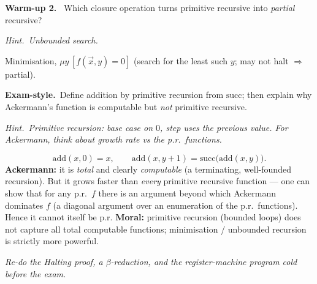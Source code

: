 \documentclass[11pt,a4paper]{article}
\newcommand{\hint}[1]{\par{\small\textcolor{accent}{\textit{Hint.}}\ \textit{#1}}\par\smallskip}
\newcommand{\warm}[1]{\smallskip\textbf{\textcolor{hi}{Warm-up #1.}}\ }
\newcommand{\exam}{\smallskip\textbf{\textcolor{warn}{Exam-style.}}\ }
\begin{document}
\warm{2} Which closure operation turns primitive recursive into \emph{partial} recursive?
\hint{Unbounded search.}
\begin{sol}Minimisation, $\mu y\,[f(\vec x,y)=0]$ (search for the least such $y$; may not halt $\Rightarrow$ partial).\end{sol}

\exam Define addition by primitive recursion from $\mathrm{succ}$; then explain why Ackermann's function is computable but \emph{not} primitive recursive.
\hint{Primitive recursion: base case on $0$, step uses the previous value. For Ackermann, think about growth rate vs the p.r.\ functions.}
\begin{sol}
\[
\mathrm{add}(x,0)=x,\qquad \mathrm{add}(x,y{+}1)=\mathrm{succ}\big(\mathrm{add}(x,y)\big).
\]
\textbf{Ackermann:} it is \emph{total} and clearly \emph{computable} (a terminating, well-founded recursion). But it grows faster than \emph{every} primitive recursive function --- one can show that for any p.r.\ $f$ there is an argument beyond which Ackermann dominates $f$ (a diagonal argument over an enumeration of the p.r.\ functions). Hence it cannot itself be p.r. \textbf{Moral:} primitive recursion (bounded loops) does not capture all total computable functions; minimisation / unbounded recursion is strictly more powerful.
\end{sol}

\vspace{0.3cm}
\begin{center}\textit{Re-do the Halting proof, a $\beta$-reduction, and the register-machine program cold before the exam.}\end{center}
\end{document}
